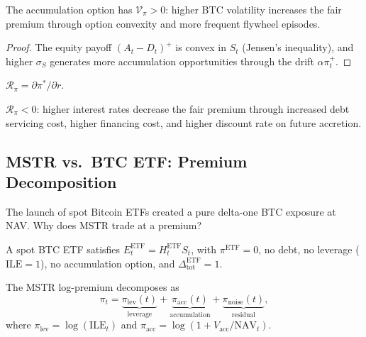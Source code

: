 \begin{proposition}\label{prop:vega}
  The accumulation option has $\mathcal{V}_\pi > 0$: higher BTC volatility
  increases the fair premium through option convexity and more frequent
  flywheel episodes.
\end{proposition}

\begin{proof}
  The equity payoff $(A_t - D_t)^+$ is convex in $S_t$ (Jensen's inequality),
  and higher $\sigma_S$ generates more accumulation opportunities through the
  drift $\alpha\pi_t^+$.
\end{proof}

\begin{definition}
  $\mathcal{R}_\pi = \partial\pi^*/\partial r$.
\end{definition}

\begin{proposition}\label{prop:rho_negative}
  $\mathcal{R}_\pi < 0$: higher interest rates decrease the fair premium
  through increased debt servicing cost, higher financing cost, and higher
  discount rate on future accretion.
\end{proposition}

\subsection{MSTR vs.\ BTC ETF: Premium Decomposition}
\label{sec:etf_comparison}

The launch of spot Bitcoin ETFs created a pure delta-one BTC exposure at
NAV.  Why does MSTR trade at a premium?

\begin{definition}\label{def:etf}
  A spot BTC ETF satisfies $E_t^{\mathrm{ETF}} = H_t^{\mathrm{ETF}}S_t$,
  with $\pi^{\mathrm{ETF}} = 0$, no debt, no leverage ($\mathrm{ILE} = 1$),
  no accumulation option, and $\Delta_{\mathrm{tot}}^{\mathrm{ETF}} = 1$.
\end{definition}

\begin{theorem}
  \label{thm:decomposition}
  The MSTR log-premium decomposes as
  \begin{equation}
    \pi_t
    = \underbrace{\pi_{\mathrm{lev}}(t)}_{\text{leverage}}
    + \underbrace{\pi_{\mathrm{acc}}(t)}_{\text{accumulation}}
    + \underbrace{\pi_{\mathrm{noise}}(t)}_{\text{residual}},
  \end{equation}
  where $\pi_{\mathrm{lev}} = \log(\mathrm{ILE}_t)$ and
  $\pi_{\mathrm{acc}} = \log(1 + V_{\mathrm{acc}}/\mathrm{NAV}_t)$.
\end{theorem}

